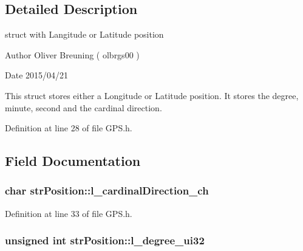 \subsection{Detailed Description}
struct with Langitude or Latitude position 



 \begin{DoxyAuthor}{Author}
Oliver Breuning ( olbrgs00 ) 
\end{DoxyAuthor}
\begin{DoxyDate}{Date}
2015/04/21
\end{DoxyDate}
This struct stores either a Longitude or Latitude position. It stores the degree, minute, second and the cardinal direction.

Definition at line 28 of file G\+P\+S.\+h.



\subsection{Field Documentation}
\hypertarget{structstrPosition_aa39fed1d421cb2260d0ef7157c3c00d0_aa39fed1d421cb2260d0ef7157c3c00d0}{
\subsubsection[{l\+\_\+cardinal\+Direction\+\_\+ch}]{\setlength{\rightskip}{0pt plus 5cm}char str\+Position\+::l\+\_\+cardinal\+Direction\+\_\+ch}}\label{structstrPosition_aa39fed1d421cb2260d0ef7157c3c00d0_aa39fed1d421cb2260d0ef7157c3c00d0}


Definition at line 33 of file G\+P\+S.\+h.

\hypertarget{structstrPosition_ac060af7d7963812c116c24cdb861f184_ac060af7d7963812c116c24cdb861f184}{
\subsubsection[{l\+\_\+degree\+\_\+ui32}]{\setlength{\rightskip}{0pt plus 5cm}unsigned int str\+Position\+::l\+\_\+degree\+\_\+ui32}}\label{structstrPosition_ac060af7d7963812c116c24cdb861f184_ac060af7d7963812c116c24cdb861f184}


